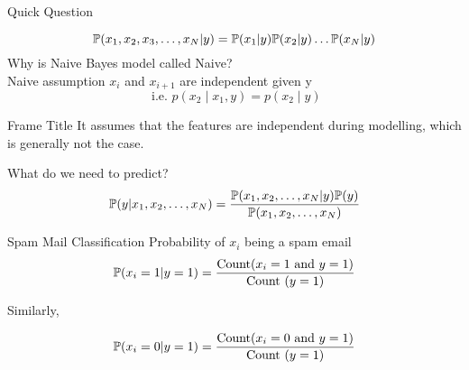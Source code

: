 \documentclass{beamer}
\begin{document}
\begin{frame}{Quick Question}
    
    
    \pause \begin{equation*}
        \mathbb{P}(x_{1},x_{2},x_{3},\dots,x_{N} \vert y) = \mathbb{P}(x_{1}|y) \mathbb{P}(x_{2}|y) \dots \mathbb{P}(x_{N}|y)
    \end{equation*}
    \pause Why is Naive Bayes model called Naive? \\

    \pause Naive assumption $x_{i}$ and $x_{i+1}$ are independent given y
    \[
    \text { i.e. }  p\left(x_{2} \mid x_{1}, y\right)=p\left(x_{2} \mid y\right)
    \]

\end{frame}


\begin{frame}{Frame Title}
    It assumes that the features are independent during modelling, which is generally not the case.
\end{frame}

\begin{frame}{What do we need to predict?}
    \begin{equation*}
        \mathbb{P}(y|x_{1},x_{2},\dots,x_{N}) =  \frac{\mathbb{P}(x_{1},x_{2},\dots,x_{N}|y)\mathbb{P}(y)}{\mathbb{P}(x_{1},x_{2},\dots,x_{N})}
    \end{equation*}
\end{frame}


\begin{frame}{Spam Mail Classification}
    Probability of $x_{i}$ being a spam email\\
    $$
    \mathbb{P}(x_{i} = 1|y = 1) = \frac{\text{Count} (x_{i} = 1 \text{ and } y = 1)}{\text{Count }(y=1)}
    $$
    
    Similarly,
    
    $$
    \mathbb{P}(x_{i} = 0|y = 1) = \frac{\text{Count} (x_{i} = 0 \text{ and } y = 1)}{\text{Count }(y=1)}
    $$
    
    
\end{frame}
\end{document}
